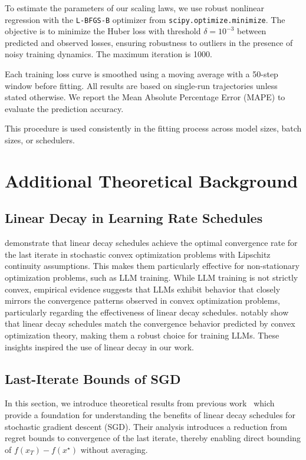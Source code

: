 \documentclass[letterpaper]{article} %
\begin{document}
To estimate the parameters of our scaling laws, we use robust nonlinear regression with the \texttt{L-BFGS-B} optimizer from \texttt{scipy.optimize.minimize}. The objective is to minimize the Huber loss with threshold \(\delta = 10^{-3}\) between predicted and observed losses, ensuring robustness to outliers in the presence of noisy training dynamics. The maximum iteration is 1000.

Each training loss curve is smoothed using a moving average with a 50-step window before fitting. All results are based on single-run trajectories unless stated otherwise. We report the Mean Absolute Percentage Error (MAPE) to evaluate the prediction accuracy. 

This procedure is used consistently in the fitting process across model sizes, batch sizes, or schedulers.

\section{Additional Theoretical Background}

\subsection{Linear Decay in Learning Rate Schedules}
\citet{zamani2023exactconvergencerateiterate, defazio2024optimallineardecaylearning, schaipp2025surprisingagreementconvexoptimization} demonstrate that linear decay schedules achieve the optimal convergence rate for the last iterate in stochastic convex optimization problems with Lipschitz continuity assumptions. This makes them particularly effective for non-stationary optimization problems, such as LLM training. While LLM training is not strictly convex, empirical evidence suggests that LLMs exhibit behavior that closely mirrors the convergence patterns observed in convex optimization problems, particularly regarding the effectiveness of linear decay schedules. \citet{schaipp2025surprisingagreementconvexoptimization} notably show that linear decay schedules match the convergence behavior predicted by convex optimization theory, making them a robust choice for training LLMs. These insights inspired the use of linear decay in our work.


\subsection{Last-Iterate Bounds of SGD}
\label{sec:theory-sgd}

In this section, we introduce theoretical results from previous work~\citep{defazio2024optimallineardecaylearning} which provide a foundation for understanding the benefits of linear decay schedules for stochastic gradient descent (SGD). Their analysis introduces a reduction from regret bounds to convergence of the last iterate, thereby enabling direct bounding of $f(x_T) - f(x^\star)$ without averaging.
\end{document}
